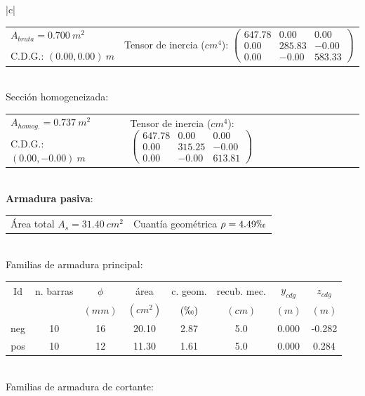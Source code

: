 \begin{table}
\begin{center}
\begin{tabular}{|c|}
\hline
\begin{tabular}{ll}
$A_{bruta}= 0.700\ m^2$ & \multirow{3}{*}{Tensor de inercia ($cm^4$): $ \left( \begin{array}{ccc}647.78 & 0.00 & 0.00 \\ 0.00 & 285.83 & -0.00 \\ 0.00 & -0.00 & 583.33 \end{array} \right)$} \\
& \\
C.D.G.: $( 0.00, 0.00)\ m$  & \\
\end{tabular} \\
\hline
Sección homogeneizada:\\
\hline
\begin{tabular}{ll}
$A_{homog.}= 0.737\ m^2$ & \multirow{3}{*}{Tensor de inercia ($cm^4$): $ \left( \begin{array}{ccc}647.78 & 0.00 & 0.00 \\ 0.00 & 315.25 & -0.00 \\ 0.00 & -0.00 & 613.81 \end{array} \right)$} \\
& \\
C.D.G.: $( 0.00,-0.00)\ m$  & \\
\end{tabular} \\
\hline
\textbf{Armadura pasiva}:\\
\hline
\begin{tabular}{ll}
Área total $A_s=31.40\ cm^2$ & Cuantía geométrica $\rho= 4.49\permil$\\
\end{tabular} \\
\hline
Familias de armadura principal:\\
\hline
\begin{tabular}{cccccccc}
Id & n. barras & $\phi$ & área & c. geom. & recub. mec. & $y_{cdg}$ & $z_{cdg}$\\
 &  & $(mm)$ & $(cm^2)$ & $(\permil)$ & $(cm)$ & $(m)$ & $(m)$\\
\hline
neg & 10 & 16 & 20.10 & 2.87 &  5.0 & 0.000 & -0.282\\
\hline
pos & 10 & 12 & 11.30 & 1.61 &  5.0 & 0.000 & 0.284\\
\end{tabular} \\
\hline
Familias de armadura de cortante:\\
\hline
\begin{tabular}{cccccccc}

\end{tabular}
\end{tabular}
\end{center}
\end{table}
